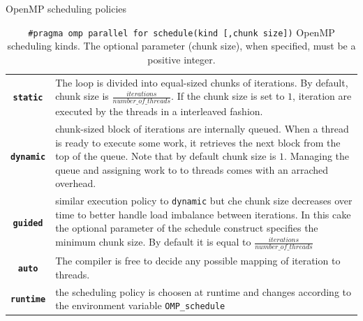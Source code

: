     \begin{table}
    	\label{tab:scheduling_policies}
    	\caption{OpenMP scheduling policies}
    	\begin{tabularx}{1.0\textwidth}{cX}
    		\rowcolor{gray!35}	
    		\heading{\textbf{Scheduling Kind}} &  \heading{\textbf{Description}} \\ \hline
    		\rowcolor{gray!15}
    		\texttt{\textbf{static}} & The loop is divided into equal-sized chunks of iterations. By default, chunk size is $\frac{iterations}{number\_of\_threads}$. If the chunk size is set to $1$, iteration are executed by the threads in a interleaved fashion.\\ \hline
    		\rowcolor{gray!5}
    		\texttt{\textbf{dynamic}} & chunk-sized block of iterations are internally queued. When a thread is ready to execute some work, it retrieves the next block  from the top of the queue. Note that by default chunk size is $1$. Managing the queue and assigning work to  to threads comes with an arrached overhead.\\ \hline
    		
    		\rowcolor{gray!15}
    		\texttt{\textbf{guided}} & similar execution policy  to \texttt{dynamic} but che chunk size decreases over time to better handle load imbalance between iterations. In this cake the optional parameter of the schedule construct specifies the minimum chunk size. By default it is equal to $\frac{iterations}{number\_of\_threads}$\\ \hline
    		
    		\rowcolor{gray!5}
    		\texttt{\textbf{auto}} & The compiler is free to decide any possible mapping of iteration to threads.\\ \hline
    		
    		\rowcolor{gray!15}
    		\texttt{\textbf{runtime}} & the scheduling policy is choosen at runtime and changes according to the environment variable \verb|OMP_schedule| \\ \hline
    	\end{tabularx}
    	\label{tab:scheduling_policies}
    	\caption[OpenMP scheduling policies]{\texttt{\#pragma omp parallel for schedule(kind [,chunk size])} OpenMP scheduling kinds. The optional parameter (chunk size), when specified, must be a positive integer. }
    \end{table}
    
